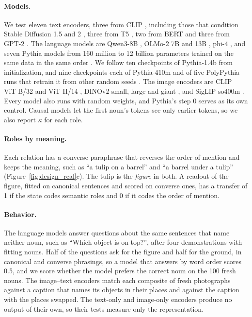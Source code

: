\documentclass[10pt]{article}
\theoremstyle{plain}
\theoremstyle{remark}
\begin{document}
\paragraph{Models.} We test eleven text encoders, three from CLIP \citep{radford2021clip}, including those that condition Stable Diffusion 1.5 and 2 \citep{rombach2022}, three from T5 \citep{raffel2020t5}, two from BERT \citep{devlin2019bert} and three from GPT-2 \citep{radford2019gpt2}. The language models are Qwen3-8B \citep{yang2025qwen3}, OLMo-2 7B and 13B \citep{olmo2024olmo2}, phi-4 \citep{abdin2024phi4}, and seven Pythia models from 160 million to 12 billion parameters trained on the same data in the same order \citep{biderman2023pythia}. We follow ten checkpoints of Pythia-1.4b from initialization, and nine checkpoints each of Pythia-410m and of five PolyPythia runs that retrain it from other random seeds \citep{vanderwal2025polypythias}. The image encoders are CLIP ViT-B/32 and ViT-H/14 \citep{radford2021clip,cherti2023}, DINOv2 small, large and giant \citep{oquab2024dinov2}, and SigLIP so400m \citep{zhai2023siglip}. Every model also runs with random weights, and Pythia's step 0 serves as its own control. Causal models let the first noun's tokens see only earlier tokens, so we also report $\kappa$ for each role.

\paragraph{Roles by meaning.} Each relation has a converse paraphrase that reverses the order of mention and keeps the meaning, such as ``a tulip on a barrel'' and ``a barrel under a tulip'' (Figure~\ref{fig:design_real}c). The tulip is the \emph{figure} in both. A readout of the figure, fitted on canonical sentences and scored on converse ones, has a transfer of 1 if the state codes semantic roles and 0 if it codes the order of mention.

\paragraph{Behavior.} The language models answer questions about the same sentences that name neither noun, such as ``Which object is on top?'', after four demonstrations with fitting nouns. Half of the questions ask for the figure and half for the ground, in canonical and converse phrasings, so a model that answers by word order scores 0.5, and we score whether the model prefers the correct noun on the 100 fresh nouns. The image--text encoders match each composite of fresh photographs against a caption that names its objects in their places and against the caption with the places swapped. The text-only and image-only encoders produce no output of their own, so their tests measure only the representation.
\end{document}
